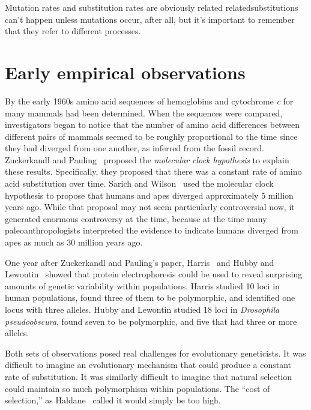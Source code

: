 \noindent Mutation rates and substitution rates are obviously related
related{\dash}substitutions can't happen unless mutations occur, after
all{\dash}, but it's important to remember that they refer to
different processes.

\section*{Early empirical observations}

By the early 1960s amino acid sequences of hemoglobins and cytochrome
{\it c\/} for many mammals had been determined. When the sequences
were compared, investigators began to notice that the number of amino
acid differences between different pairs of mammals seemed to be
roughly proportional to the time since they had diverged from one
another, as inferred from the fossil record. Zuckerkandl and
Pauling~\cite{Zuckerkandl-Pauling65} proposed the {\it molecular clock
hypothesis\/} to explain these results. Specifically, they proposed
that there was a constant rate of amino acid substitution over
time. Sarich and Wilson~\cite{Sarich-Wilson67,Wilson-Sarich69} used
the molecular clock hypothesis to propose that humans and apes
diverged approximately 5 million years ago. While that proposal may
not seem particularly controversial now, it generated enormous
controversy at the time, because at the time many paleoanthropologists
interpreted the evidence to indicate humans diverged from apes as much
as 30 million years ago.

One year after Zuckerkandl and Pauling's paper, Harris~\cite{Harris66}
and Hubby and Lewontin~\cite{Hubby-Lewontin66,Lewontin-Hubby66} showed
that protein electrophoresis could be used to reveal surprising
amounts of genetic variability within populations. Harris studied
10 loci in human populations, found three of them to be polymorphic,
and identified one locus with three alleles. Hubby and Lewontin
studied 18 loci in {\it Drosophila pseudoobscura\/}, found seven to be
polymorphic, and five that had three or more alleles.

Both sets of observations posed real challenges for evolutionary
geneticists. It was difficult to imagine an evolutionary mechanism
that could produce a constant rate of substitution. It was similarly
difficult to imagine that natural selection could maintain so much
polymorphism within populations. The ``cost of selection,'' as
Haldane~\cite{Haldane-1957} called it would simply be too
high.

